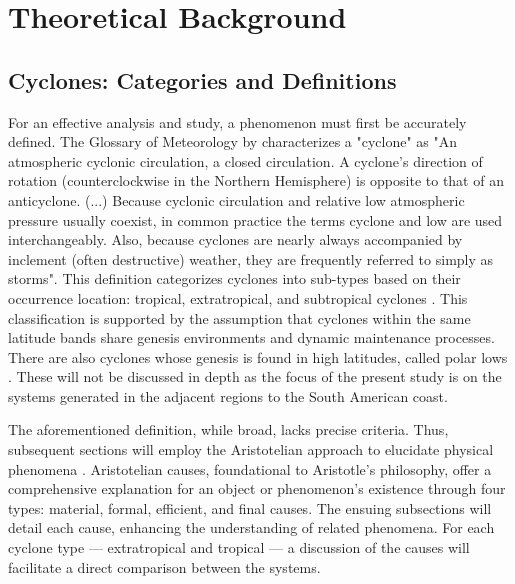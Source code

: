 



% 

\chapter{Theoretical Background}\label{fundamentos}

\section{Cyclones: Categories and Definitions}

For an effective analysis and study, a phenomenon must first be accurately defined. The Glossary of Meteorology by \citet{AMS2023Cyclone} characterizes a "cyclone" as "An atmospheric cyclonic circulation, a closed circulation. A cyclone's direction of rotation (counterclockwise in the Northern Hemisphere) is opposite to that of an anticyclone. (...) Because cyclonic circulation and relative low atmospheric pressure usually coexist, in common practice the terms cyclone and low are used interchangeably. Also, because cyclones are nearly always accompanied by inclement (often destructive) weather, they are frequently referred to simply as storms". This definition categorizes cyclones into sub-types based on their occurrence location: tropical, extratropical, and subtropical cyclones \citep[e.g.]{reboita2017ciclones}. This classification is supported by the assumption that cyclones within the same latitude bands share genesis environments and dynamic maintenance processes. There are also cyclones whose genesis is found in high latitudes, called polar lows \citep[e.g.]{emanuel1989polar,harrold1969polar}. These will not be discussed in depth as the focus of the present study is on the systems generated in the adjacent regions to the South American coast.

The aforementioned definition, while broad, lacks precise criteria. Thus, subsequent sections will employ the Aristotelian approach to elucidate physical phenomena \citep{aristotle1933metaphysics}. Aristotelian causes, foundational to Aristotle's philosophy, offer a comprehensive explanation for an object or phenomenon's existence through four types: material, formal, efficient, and final causes. The ensuing subsections will detail each cause, enhancing the understanding of related phenomena. For each cyclone type — extratropical and tropical — a discussion of the causes will facilitate a direct comparison between the systems.

